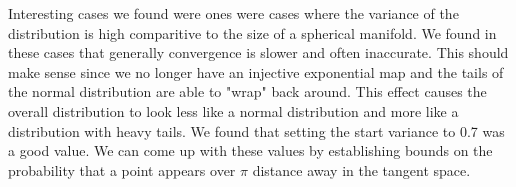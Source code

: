 \documentclass{article}
\begin{document}
Interesting cases we found were ones were cases where the variance of the distribution is high comparitive to the size of a spherical manifold.
We found in these cases that generally convergence is slower and often inaccurate.
This should make sense since we no longer have an injective exponential map and the tails of the normal distribution are able to "wrap" back around.
This effect causes the overall distribution to look less like a normal distribution and more like a distribution with heavy tails.
We found that setting the start variance to 0.7 was a good value.
We can come up with these values by establishing bounds on the probability that a point appears over $\pi$ distance away in the tangent space.
\end{document}
